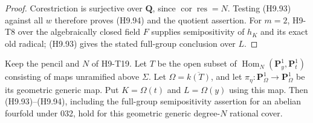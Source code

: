 \begin{proof}
Corestriction is surjective over $\mathbf Q$, since
$\operatorname{cor}\operatorname{res}=N$. Testing (H9.93)
against all $w$ therefore proves (H9.94) and the quotient
assertion. For $m=2$, H9-T8 over the algebraically closed field
$F$ supplies semipositivity of $h_K$ and its exact old radical;
(H9.93) gives the stated full-group conclusion over $L$.
\end{proof}

\begin{corollary}
Keep the pencil and $N$ of H9-T19. Let $T$ be the open subset of
$\operatorname{Hom}_N(\mathbf P^1_y,\mathbf P^1_t)$ consisting
of maps unramified above $\Sigma$. Let
$\Omega=\overline{k(T)}$, and let
$\pi_\eta:\mathbf P^1_\Omega\to\mathbf P^1_\Omega$ be its
geometric generic map. Put $K=\Omega(t)$ and
$L=\Omega(y)$ using this map. Then (H9.93)--(H9.94), including
the full-group semipositivity assertion for an abelian fourfold
under 032, hold for this geometric generic degree-$N$ rational
cover.
\end{corollary}

